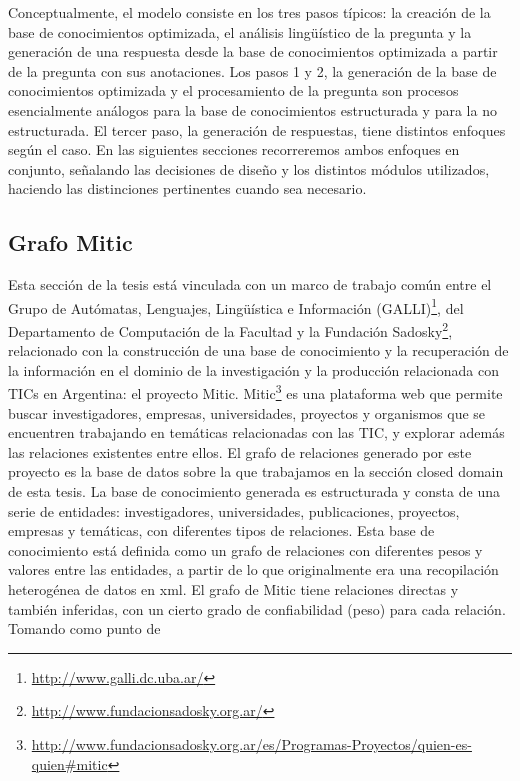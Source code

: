 Conceptualmente, el modelo consiste en los tres pasos típicos: la
creación de la base de conocimientos optimizada, el análisis
lingüístico de la pregunta y la generación de una respuesta desde
la base de conocimientos optimizada a partir de la pregunta con sus
anotaciones. 
Los pasos 1 y 2, la generación de la base de conocimientos optimizada y el procesamiento de la pregunta son procesos
esencialmente análogos para la base de conocimientos estructurada y para la no estructurada. El tercer paso, la generación de respuestas,
tiene distintos enfoques según el caso. 
En las siguientes secciones recorreremos ambos enfoques en conjunto, señalando las decisiones de dise\~no y los distintos módulos
utilizados, haciendo las distinciones pertinentes cuando sea necesario.



\subsection{Grafo Mitic}
\label{subsec:mitic}
\horrible
Esta sección de la tesis está vinculada con un marco de trabajo común entre el
Grupo de Autómatas, Lenguajes, Lingüística e Información (GALLI)\footnote{\url{http://www.galli.dc.uba.ar/}}, 
del Departamento de Computación de la Facultad y la Fundación Sadosky\footnote{\url{http://www.fundacionsadosky.org.ar/}}, relacionado con la construcción de una base de conocimiento
 y la recuperación de la información en el dominio de la investigación y la
producción relacionada con TICs en Argentina: el proyecto Mitic.
Mitic\footnote{\url{http://www.fundacionsadosky.org.ar/es/Programas-Proyectos/quien-es-quien\#mitic}} es una plataforma web que permite buscar investigadores, empresas, universidades, proyectos y organismos que se encuentren trabajando en temáticas relacionadas con las TIC, y explorar además las relaciones existentes entre ellos. El grafo de relaciones generado por este proyecto es la base de datos sobre la que trabajamos en la sección closed domain de esta tesis.
La base de conocimiento generada es estructurada y consta de
una serie de entidades: investigadores, universidades, publicaciones,
proyectos, empresas y temáticas, con diferentes tipos de relaciones.
Esta base de conocimiento está definida como un grafo de relaciones con diferentes pesos y valores entre
las entidades, a partir de lo que originalmente era una
recopilación heterogénea de datos en xml. El grafo de Mitic
tiene relaciones directas y también inferidas, con un cierto grado
de confiabilidad (peso) para cada relación. Tomando como punto de
